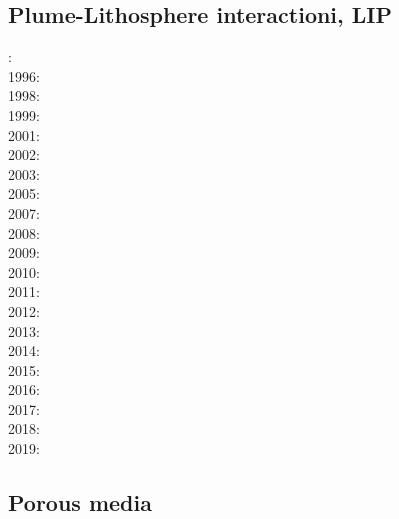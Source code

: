 \subsection{Plume-Lithosphere interactioni, LIP}

{\scriptsize
{}: \cite{rich94}\cite{fari94}\\
1996: \cite{zhgm96}\\
1998: \cite{bisp98}\cite{most98}\\
1999: \cite{most99}\cite{shet99}\\
2001: \cite{vapy01}\\
2002: \cite{foul02}\\
2003: \cite{vazh03}\\
2005: \cite{bugu05}\cite{fasa05}\\
2007: \cite{stco07}\\
2008: \cite{uegs08}\cite{slee08}\\
2009: \cite{bucl09}\cite{zhgy09}\cite{baiv10}\cite{tabs09}\cite{maml09}\\
2010: \cite{fabl10}\\
2011: \cite{sosk11}\cite{vasd11}\\
2012: \cite{huco12}\\
2013: \cite{bemm12}\cite{brps13}\\
2014: \cite{buge14}\cite{gery14b}\cite{buto14}\cite{buit14}\cite{leli14}\\
2015: \cite{bemm15}\cite{gesb15}\cite{kocb15}\cite{meds15}\cite{lile15}\\
2016: \cite{fige16}\cite{gadb16}\cite{kobc16}\\
2017: \cite{bahf17}\cite{brsg17}\cite{bahf17}\cite{bekb17}\cite{kocb17}\\
2018: \cite{daga18}\\
2019: \cite{kobg19}
}



\subsection{Porous media} 

{\scriptsize
\noindent
\cite{scst86}
\cite{scot88}
\cite{spie93}
\cite{scth00b}
\cite{dyge13}
}

